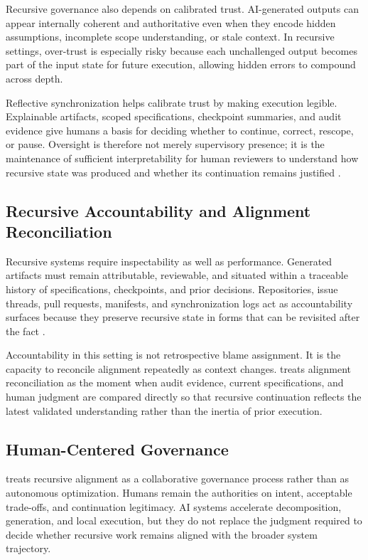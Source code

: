 Recursive governance also depends on calibrated trust. AI-generated outputs can appear internally coherent and authoritative even when they encode hidden assumptions, incomplete scope understanding, or stale context. In recursive settings, over-trust is especially risky because each unchallenged output becomes part of the input state for future execution, allowing hidden errors to compound across depth.

Reflective synchronization helps calibrate trust by making execution legible. Explainable artifacts, scoped specifications, checkpoint summaries, and audit evidence give humans a basis for deciding whether to continue, correct, rescope, or pause. Oversight is therefore not merely supervisory presence; it is the maintenance of sufficient interpretability for human reviewers to understand how recursive state was produced and whether its continuation remains justified \cite{Amershi2014InteractiveML,Shneiderman2020HCAI}.

\subsection{Recursive Accountability and Alignment Reconciliation}

Recursive systems require inspectability as well as performance. Generated artifacts must remain attributable, reviewable, and situated within a traceable history of specifications, checkpoints, and prior decisions. Repositories, issue threads, pull requests, manifests, and synchronization logs act as accountability surfaces because they preserve recursive state in forms that can be revisited after the fact \cite{Lamport1978TimeClocks,Chandy1985DistributedSnapshots,Hutchins1995CognitionWild}.

Accountability in this setting is not retrospective blame assignment. It is the capacity to reconcile alignment repeatedly as context changes.  treats alignment reconciliation as the moment when audit evidence, current specifications, and human judgment are compared directly so that recursive continuation reflects the latest validated understanding rather than the inertia of prior execution.

\subsection{Human-Centered Governance}

 treats recursive alignment as a collaborative governance process rather than as autonomous optimization. Humans remain the authorities on intent, acceptable trade-offs, and continuation legitimacy. AI systems accelerate decomposition, generation, and local execution, but they do not replace the judgment required to decide whether recursive work remains aligned with the broader system trajectory.

